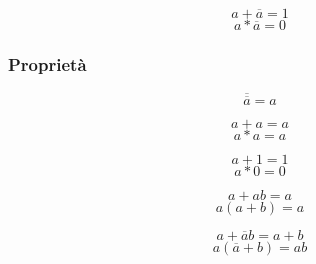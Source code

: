 \begin{definition}[Complemento]
    \begin{equation}
        a+\overline{a}=1
    \end{equation}
    \begin{equation*}
        a*\overline{a}=0
    \end{equation*}
\end{definition}

\subsubsection*{Proprietà}
\begin{definition}[Involuzione]
    \begin{equation}
        \overline{\overline{a}}=a
    \end{equation}
\end{definition}

\begin{definition}[Idempotenza]
    \begin{equation}
        a+a=a
    \end{equation}
    \begin{equation*}
        a*a=a
    \end{equation*}
\end{definition}

\begin{definition}
    \begin{equation}
        a+1=1
    \end{equation}
    \begin{equation*}
        a*0=0
    \end{equation*}
\end{definition}

\begin{definition}[Assorbimento 1]
    \begin{equation}
        a+ab=a
    \end{equation}
    \begin{equation*}
        a(a+b)=a
    \end{equation*}
\end{definition}

\begin{definition}[Assorbimento 2]
    \begin{equation}
        a+\overline{a}b=a+b
    \end{equation}
    \begin{equation*}
        a(\overline{a}+b)=ab
    \end{equation*}
\end{definition}

